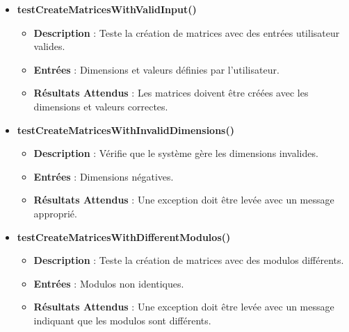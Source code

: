 \documentclass[12pt, a4paper, onecolumn]{article}
\begin{document}
	\begin{itemize}
		\item \textbf{testCreateMatricesWithValidInput()}
		\begin{itemize}
			\item \textbf{Description} : Teste la création de matrices avec des entrées utilisateur valides.
			\item \textbf{Entrées} : Dimensions et valeurs définies par l'utilisateur.
			\item \textbf{Résultats Attendus} : Les matrices doivent être créées avec les dimensions et valeurs correctes.
		\end{itemize}
		
		\item \textbf{testCreateMatricesWithInvalidDimensions()}
		\begin{itemize}
			\item \textbf{Description} : Vérifie que le système gère les dimensions invalides.
			\item \textbf{Entrées} : Dimensions négatives.
			\item \textbf{Résultats Attendus} : Une exception doit être levée avec un message approprié.
		\end{itemize}
		
		\item \textbf{testCreateMatricesWithDifferentModulos()}
		\begin{itemize}
			\item \textbf{Description} : Teste la création de matrices avec des modulos différents.
			\item \textbf{Entrées} : Modulos non identiques.
			\item \textbf{Résultats Attendus} : Une exception doit être levée avec un message indiquant que les modulos sont différents.
		\end{itemize}
	\end{itemize}
	
	
	
	
\end{document}
